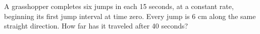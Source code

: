 A grasshopper completes six jumps in each 15 seconds, at a constant rate, beginning its first jump interval at time zero. Every jump is 6 cm along the same straight direction. How far has it traveled after 40 seconds?
